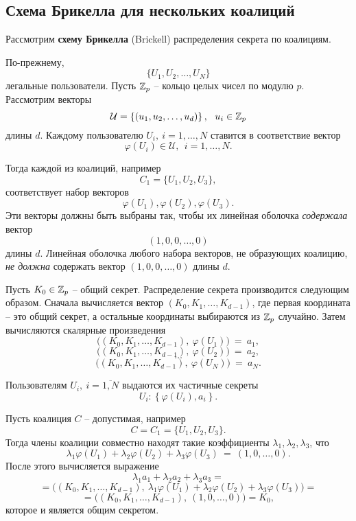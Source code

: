 \subsection{Схема Брикелла для нескольких коалиций}

Рассмотрим \textbf{схему Брикелла} (Brickell) распределения секрета по коалициям.

По-прежнему,
    \[ \{ U_1, U_2, \dots, U_N \} \]
легальные пользователи. Пусть $\mathbb{Z}_p$ -- кольцо целых чисел по модулю $p$. Рассмотрим векторы
    \[ \mathcal{U} = \left\{ (u_1, u_2, \dots, u_d) \right\}, ~~ u_i \in \mathbb{Z}_p \]
длины $d$. Каждому пользователю $U_i, ~ i = 1, \dots, N$ ставится в соответствие вектор
    \[ \varphi(U_i) \in \mathcal{U}, ~~ i = 1, \dots, N. \]

Тогда каждой из коалиций, например
    \[ C_1 = \{ U_1, U_2, U_3 \}, \]
соответствует набор векторов
    \[ \varphi(U_1), \varphi(U_2), \varphi(U_3). \]
Эти векторы должны быть выбраны так, чтобы их линейная оболочка \emph{содержала} вектор
    \[ (1, 0, 0, \dots, 0) \]
длины $d$. Линейная оболочка любого набора векторов, не образующих коалицию, \emph{не должна} содержать вектор $(1, 0, 0, \dots, 0)$ длины $d$.

Пусть $K_0 \in \mathbb{Z}_p$ -- общий секрет. Распределение секрета производится следующим образом. Сначала вычисляется вектор $(K_0, K_1, \dots, K_{d-1})$, где первая координата -- это общий секрет, а остальные координаты выбираются из $\mathbb{Z}_p$ случайно. Затем вычисляются скалярные произведения
\[
    \Big( \left( K_0, K_1, \dots, K_{d-1} \right), ~ \varphi(U_1) \Big) ~=~ a_1,
\] \[
    \Big( \left( K_0, K_1, \dots, K_{d-1} \right), ~ \varphi(U_2) \Big) ~=~ a_2,
\] \[
    \dots
\] \[
    \Big( \left( K_0, K_1, \dots, K_{d-1} \right), ~ \varphi(U_N) \Big) ~=~ a_N.
\]

Пользователям $U_i, ~ i = \overline{1,N}$ выдаются их частичные секреты
    \[ U_i \colon \left\{ \varphi(U_i), a_i \right\}. \]

Пусть коалиция $C$ -- допустимая, например
    \[ C = C_1 = \{ U_1, U_2, U_3 \}. \]
Тогда члены коалиции совместно находят такие коэффициенты $\lambda_1, \lambda_2, \lambda_3$, что
    \[ \lambda_1\varphi(U_1)+\lambda_2\varphi(U_2)+\lambda_3\varphi(U_3) ~=~ (1,0, \dots, 0). \]
После этого вычисляется выражение
\[
    \lambda_1 a_1 + \lambda_2 a_2 + \lambda_3 a_3 =
\] \[
    = \Big( \left( K_0, K_1, \dots, K_{d-1} \right), ~ \lambda_1 \varphi(U_1) + \lambda_2 \varphi(U_2) + \lambda_3 \varphi(U_3) \Big) =
\] \[
    = \Big( \left( K_0, K_1, \dots, K_{d-1} \right), ~ \left( 1, 0, \dots, 0 \right) \Big) =  K_0,
\]
которое и является общим секретом.

